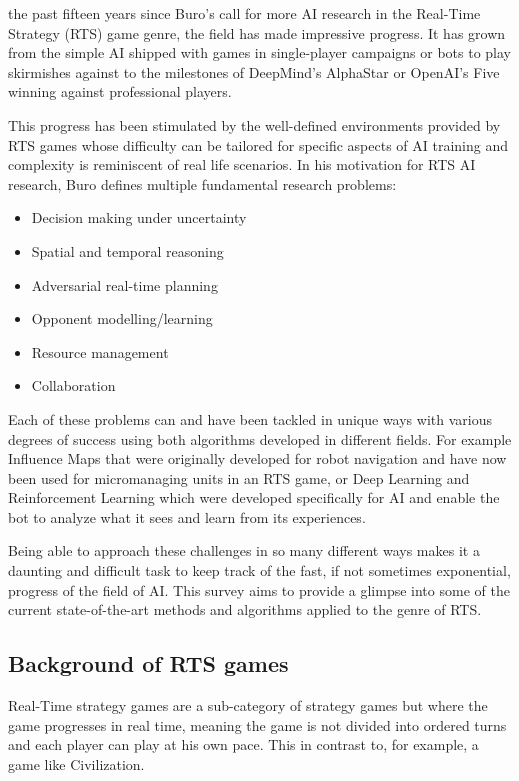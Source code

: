  the past fifteen years since Buro's\citep{buro2004call} call for more AI research in the Real-Time Strategy (RTS) game genre, the field has made impressive progress. It has grown from the simple AI shipped with games in single-player campaigns or bots to play skirmishes against to the milestones of DeepMind's AlphaStar\citep{arulkumaran2019alphastar} or OpenAI's Five\citep{openaifive} winning against professional players. 

This progress has been stimulated by the well-defined environments provided by RTS games whose difficulty can be tailored for specific aspects of AI training and complexity is reminiscent of real life scenarios. In his motivation for RTS AI research\citep{buro2004rts}, Buro defines multiple fundamental research problems:
\begin{itemize}
    \item Decision making under uncertainty
    \item Spatial and temporal reasoning
    \item Adversarial real-time planning
    \item Opponent modelling/learning
    \item Resource management
    \item Collaboration
\end{itemize}

Each of these problems can and have been tackled in unique ways with various degrees of success using both algorithms developed in different fields. For example Influence Maps\citep{uriarte2012kiting} that were originally developed for robot navigation and have now been used for micromanaging units in an RTS game, or Deep Learning\citep{lecun2015deep} and Reinforcement Learning\citep{mnih2015human} which were developed specifically for AI and enable the bot to analyze what it sees and learn from its experiences.

Being able to approach these challenges in so many different ways makes it a daunting and difficult task to keep track of the fast, if not sometimes exponential, progress of the field of AI. This survey aims to provide a glimpse into some of the current state-of-the-art methods and algorithms applied to the genre of RTS.

\subsection{Background of RTS games}
Real-Time strategy games are a sub-category of strategy games but where the game progresses in real time, meaning the game is not divided into ordered turns and each player can play at his own pace. This in contrast to, for example, a game like Civilization\citep{civilization}.

